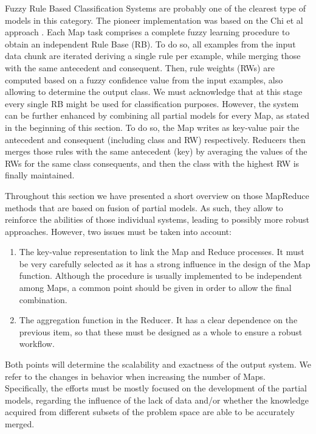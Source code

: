 \documentclass[3p,review]{elsarticle}
\begin{document}
Fuzzy Rule Based Classification Systems \cite{Fer16_fuzzyBD} are probably one of the clearest type of models in this category. The pioneer implementation was based on the Chi et al approach \cite{RioLBH15-Fuzzy}. Each Map task comprises a complete fuzzy learning procedure to obtain an independent Rule Base (RB). To do so, all examples from the input data chunk are iterated deriving a single rule per example, while merging those with the same antecedent and consequent. Then, rule weights (RWs) are computed based on a fuzzy confidence value from the input examples, also allowing to determine the output class. We must acknowledge that at this stage every single RB might be used for classification purposes. However, the system can be further enhanced by combining all partial models for every Map, as stated in the beginning of this section. To do so, the Map writes as key-value pair the antecedent and consequent (including class and RW) respectively. Reducers then merges those rules with the same antecedent (key) by averaging the values of the RWs for the same class consequents, and then the class with the highest RW is finally maintained. 


Throughout this section we have presented a short overview on those MapReduce methods that are based on fusion of partial models. As such, they allow to reinforce the abilities of those individual systems, leading to possibly more robust approaches. However, two issues must be taken into account:

\begin{enumerate}
\item The key-value representation to link the Map and Reduce processes. It must be very carefully selected as it has a strong influence in the design of the Map function. Although the procedure is usually implemented to be independent among Maps, a common point should be given in order to allow the final combination. 

\item The aggregation function in the Reducer. It has a clear dependence on the previous item, so that these must be designed as a whole to ensure a robust workflow.

\end{enumerate}

Both points will determine the scalability and exactness of the output system. We refer to the changes in behavior when increasing the number of Maps. Specifically, the efforts must be mostly focused on the development of the partial models, regarding the influence of the lack of data and/or whether the knowledge acquired from different subsets of the problem space are able to be accurately merged.
\end{document}
